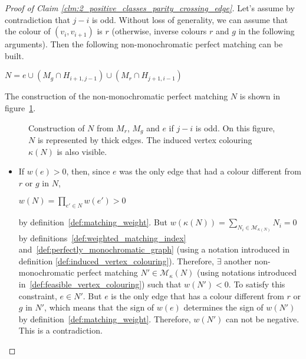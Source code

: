 \begin{proof}[Proof of Claim \ref{clm:2_positive_classes_parity_crossing_edge}]
    Let's assume by contradiction that $j-i$ is odd.
    Without loss of generality, we can assume that the colour of $(v_i, v_{i+1})$ is $r$ (otherwise, inverse colours $r$ and $g$ in the following arguments).
    Then the following non-monochromatic perfect matching can be built.

    \begin{center}
        $N = e \cup (M_g \cap H_{i+1, j-1}) \cup (M_r \cap H_{j+1, i-1})$
    \end{center}

    The construction of the non-monochromatic perfect matching $N$ is shown in figure~\ref{fig:2_pos_classes_odd_crossings}.

    \begin{figure}[H]
        \caption{Construction of $N$ from $M_r$, $M_g$ and $e$ if $j-i$ is odd.
            On this figure, $N$ is represented by thick edges.
            The induced vertex colouring $\kappa(N)$ is also visible.}
        \label{fig:2_pos_classes_odd_crossings}
    \end{figure}

    \begin{itemize}
        \item If $w(e) > 0$, then, since $e$ was the only edge that had a colour different from $r$ or $g$ in $N$,
        \begin{center}
            $w(N) = \prod\limits_{e' \in N} w(e') > 0$
        \end{center}
        by definition~\ref{def:matching_weight}.
        But $w(\kappa(N)) = \sum\limits_{N_i \in \mathcal{M}_{\kappa(N)}} N_i = 0$ by definitions~\ref{def:weighted_matching_index} and~\ref{def:perfectly_monochromatic_graph} (using a notation introduced in definition \ref{def:induced_vertex_colouring}).
        Therefore, $\exists$ another non-monochromatic perfect matching $N' \in \mathcal{M}_\kappa(N)$ (using notations introduced in~\ref{def:feasible_vertex_colouring}) such that $w(N') < 0$.
        To satisfy this constraint, $e \in N'$.
        But $e$ is the only edge that has a colour different from $r$ or $g$ in $N'$, which means that the sign of $w(e)$ determines the sign of $w(N')$ by definition~\ref{def:matching_weight}.
        Therefore, $w(N')$ can not be negative.
        This is a contradiction.


\end{itemize}
\end{proof}
